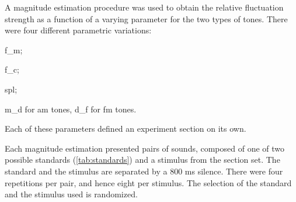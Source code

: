 \documentclass[../main.tex]{subfiles}
\begin{document}
A magnitude estimation procedure was used to obtain the relative fluctuation
strength as a function of a varying parameter for the two types of tones. There
were four different parametric variations:
\begin{inparaenum}[(1)]
  \item \gls{f_m};
  \item \gls{f_c};
  \item \gls{spl};
  \item \gls{m_d} for \gls{am} tones, \gls{d_f} for \gls{fm} tones.
\end{inparaenum}
Each of these parameters defined an experiment section on its own.

Each magnitude estimation presented pairs of sounds, composed of one of two
possible standards (\cref{tab:standards}) and a stimulus from the section set.
The standard and the stimulus are separated by a 800 ms silence. There were four
repetitions per pair, and hence eight per stimulus. The selection of the
standard and the stimulus used is randomized.
\end{document}
